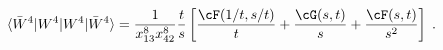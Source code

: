\begin{equation}\label{8''d}
  \langle \bar W^4| W^4|W^4|\bar W^4 \rangle =  \frac{1}{x^8_{13}x^8_{42}} 
 \frac{t}{s}\left[\frac{\cF(1/t,s/t)}{t} + \frac{\cG(s,t)}{s}   + \frac{\cF(s,t)}{s^2} \right] \;.
\end{equation} 
